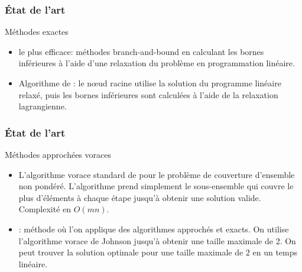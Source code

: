 \documentclass[aspectratio=169,11pt]{beamer}
\begin{document}

	\begin{frame}
		\frametitle{État de l'art}
		\begin{block}{Méthodes exactes}
			\begin{itemize}
				\item le plus efficace: méthodes branch-and-bound en calculant les bornes inférieures à l'aide d'une relaxation du problème en programmation linéaire.~\cite{caprara2000algorithms}
				\item Algorithme de \citeauthor{Beasley1987}: le nœud racine utilise la solution du programme linéaire relaxé, puis les bornes inférieures sont calculées à l'aide de la relaxation lagrangienne.~\cite{Beasley1987}
			\end{itemize}
		\end{block}
	\end{frame}
	\begin{frame}
		\frametitle{État de l'art}
		\begin{block}{Méthodes approchées voraces}
			\begin{itemize}
				\item L'algorithme vorace standard de \citeauthor{Johnson:1973:AAC:800125.804034} pour le problème de couverture d'ensemble non pondéré. L'algorithme prend simplement le sous-ensemble qui couvre le plus d'éléments à chaque étape jusqu'à obtenir une solution valide. Complexité en \(O(mn)\).~\cite{Johnson:1973:AAC:800125.804034}
				\item \citeauthor{Goldschmidt:1993:MGH:177276.177287}: méthode où l'on applique des
					algorithmes approchés et exacts.
					On utilise l'algorithme vorace de Johnson jusqu'à obtenir une taille maximale de 2.
					On peut trouver la solution optimale pour une taille maximale de 2 en un temps linéaire.~\cite{Goldschmidt:1993:MGH:177276.177287}
			\end{itemize}
		\end{block}
	\end{frame}
\end{document}

